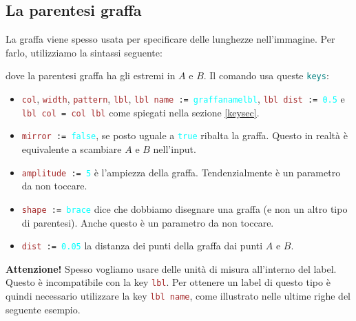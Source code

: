 \documentclass[italian, a4paper]{article}
\newcommand{\bs}{\textbackslash}
\newcommand{\ttt}[1]{\texttt{#1}}
\newcommand{\codice}[2][\large]{\vspace*{1mm}\noindent\fbox{\parbox{\textwidth}{#1\ttt{#2}}}}
\newcommand{\blue}[1]{\textcolor{blue}{#1}}
\newcommand{\cyan}[1]{\textcolor{cyan}{#1}}
\newcommand{\keys}{\textcolor{teal}{\ttt{keys}}}
\newcommand{\key}[1]{\textcolor{brown}{\ttt{#1}}}
\newcommand{\keyval}[1]{\cyan{\ttt{#1}}}
\begin{document}
\subsection{La parentesi graffa}
La graffa viene spesso usata per specificare delle lunghezze nell'immagine. Per farlo, utilizziamo la sintassi seguente:

\codice{\bs graffa[\keys]\{\blue{$A$}\}\{\blue{$B$}\};}
dove la parentesi graffa ha gli estremi in $A$ e $B$. Il comando usa queste \keys:
\begin{itemize}[nolistsep]
\item \key{col}, \key{width}, \key{pattern}, \key{lbl}, \ttt{\key{lbl name} := \keyval{graffanamelbl}}, \ttt{\key{lbl dist} := \keyval{0.5}} e \ttt{\key{lbl col} = \key{col lbl}} come spiegati nella sezione \ref{keysec}.
\item \ttt{\key{mirror} := \keyval{false}}, se posto uguale a \keyval{true} ribalta la graffa. Questo in realtà è equivalente a scambiare $A$ e $B$ nell'input.
\item \ttt{\key{amplitude} := \keyval{5}} è l'ampiezza della graffa. Tendenzialmente è un parametro da non toccare.
\item \ttt{\key{shape} := \keyval{brace}} dice che dobbiamo disegnare una graffa (e non un altro tipo di parentesi). Anche questo è un parametro da non toccare.
\item \ttt{\key{dist} := \keyval{0.05}} la distanza dei punti della graffa dai punti $A$ e $B$.
\end{itemize}

\textbf{Attenzione!} Spesso vogliamo usare delle unità di misura all'interno del label. Questo è incompatibile con la key \key{lbl}. Per ottenere un label di questo tipo è quindi necessario utilizzare la key \key{lbl name}, come illustrato nelle ultime righe del seguente esempio.
\end{document}
